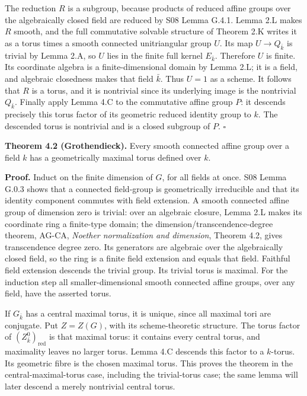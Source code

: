 \documentclass[11pt,a4paper,openany]{report}
\begin{document}
The reduction \(R\) is a subgroup, because products of reduced affine groups over the algebraically closed field are reduced by S08 Lemma G.4.1. Lemma 2.L makes \(R\) smooth, and the full commutative solvable structure of Theorem 2.K writes it as a torus times a smooth connected unitriangular group \(U\). Its map \(U\to Q_{\bar k}\) is trivial by Lemma 2.A, so \(U\) lies in the finite full kernel \(E_{\bar k}\). Therefore \(U\) is finite. Its coordinate algebra is a finite-dimensional domain by Lemma 2.L; it is a field, and algebraic closedness makes that field \(\bar k\). Thus \(U=1\) as a scheme. It follows that \(R\) is a torus, and it is nontrivial since its underlying image is the nontrivial \(Q_{\bar k}\). Finally apply Lemma 4.C to the commutative affine group \(P\): it descends precisely this torus factor of its geometric reduced identity group to \(k\). The descended torus is nontrivial and is a closed subgroup of \(P\). \(\square\)

\textbf{Theorem 4.2 (Grothendieck).} Every smooth connected affine group over a field \(k\) has a geometrically maximal torus defined over \(k\).

\textbf{Proof.} Induct on the finite dimension of \(G\), for all fields at once. S08 Lemma G.0.3 shows that a connected field-group is geometrically irreducible and that its identity component commutes with field extension. A smooth connected affine group of dimension zero is trivial: over an algebraic closure, Lemma 2.L makes its coordinate ring a finite-type domain; the dimension/transcendence-degree theorem, AG-CA, \emph{Noether normalization and dimension}, Theorem 4.2, gives transcendence degree zero. Its generators are algebraic over the algebraically closed field, so the ring is a finite field extension and equals that field. Faithful field extension descends the trivial group. Its trivial torus is maximal. For the induction step all smaller-dimensional smooth connected affine groups, over any field, have the asserted torus.

If \(G_{\bar k}\) has a central maximal torus, it is unique, since all maximal tori are conjugate. Put \(Z=Z(G)\), with its scheme-theoretic structure. The torus factor of \((Z_{\bar k}^0)_{\mathrm{red}}\) is that maximal torus: it contains every central torus, and maximality leaves no larger torus. Lemma 4.C descends this factor to a \(k\)-torus. Its geometric fibre is the chosen maximal torus. This proves the theorem in the central-maximal-torus case, including the trivial-torus case; the same lemma will later descend a merely nontrivial central torus.
\end{document}
